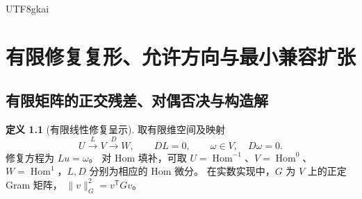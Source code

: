 \documentclass[12pt,a4paper,openany,notitlepage]{report}
\theoremstyle{plain}
\theoremstyle{definition}
\newtheorem{definition}[theorem]{定义}
\theoremstyle{remark}
\begin{document}
\begin{CJK*}{UTF8}{gkai}
\chapter{有限修复复形、允许方向与最小兼容扩张}
\label{exp:ch:extension}

\section{有限矩阵的正交残差、对偶否决与构造解}
\label{hgov:linear-certificate}

\begin{definition}[有限线性修复呈示]
\label{hgov:def-linear}
取有限维空间及映射
\[
 U\xrightarrow{L}V\xrightarrow{D}W,\qquad DL=0,
 \qquad \omega\in V,\quad D\omega=0.
\]
修复方程为 $Lu=\omega$。
对 Hom 填补，可取
$U=\operatorname{Hom}^{-1}$、$V=\operatorname{Hom}^{0}$、
$W=\operatorname{Hom}^{1}$，$L,D$ 分别为相应的 Hom 微分。
在实数实现中，$G$ 为 $V$ 上的正定 Gram 矩阵，
$\|v\|_G^2=v^{\mathsf T}Gv$。
\end{definition}


\end{CJK*}
\end{document}
